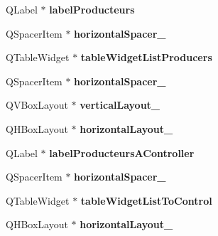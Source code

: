 \begin{DoxyCompactItemize}
\item 
\hypertarget{classUi__MainWindow2_ac139e252e74cac40ad92367d630a1291}{Q\-Label $\ast$ {\bfseries label\-Producteurs}}\label{classUi__MainWindow2_ac139e252e74cac40ad92367d630a1291}

\item 
\hypertarget{classUi__MainWindow2_a14a4b243d8845d0acc2425fb8d546f4c}{Q\-Spacer\-Item $\ast$ {\bfseries horizontal\-Spacer\-\_}}\label{classUi__MainWindow2_a14a4b243d8845d0acc2425fb8d546f4c}

\item 
\hypertarget{classUi__MainWindow2_a4dba57947c63c57efe8fd07a63258927}{Q\-Table\-Widget $\ast$ {\bfseries table\-Widget\-List\-Producers}}\label{classUi__MainWindow2_a4dba57947c63c57efe8fd07a63258927}

\item 
\hypertarget{classUi__MainWindow2_a91f77fb52ba53b76ad3d18509a104251}{Q\-Spacer\-Item $\ast$ {\bfseries horizontal\-Spacer\-\_}}\label{classUi__MainWindow2_a91f77fb52ba53b76ad3d18509a104251}

\item 
\hypertarget{classUi__MainWindow2_a8ad87390526f5ccb43afa10f6acd932f}{Q\-V\-Box\-Layout $\ast$ {\bfseries vertical\-Layout\-\_}}\label{classUi__MainWindow2_a8ad87390526f5ccb43afa10f6acd932f}

\item 
\hypertarget{classUi__MainWindow2_acb6d2458d307d805be02fa2a69c24d43}{Q\-H\-Box\-Layout $\ast$ {\bfseries horizontal\-Layout\-\_}}\label{classUi__MainWindow2_acb6d2458d307d805be02fa2a69c24d43}

\item 
\hypertarget{classUi__MainWindow2_aaceff68f2657801eabf1369594cdbd49}{Q\-Label $\ast$ {\bfseries label\-Producteurs\-A\-Controller}}\label{classUi__MainWindow2_aaceff68f2657801eabf1369594cdbd49}

\item 
\hypertarget{classUi__MainWindow2_abecd0bcf030b1589a6e9b0f598227b77}{Q\-Spacer\-Item $\ast$ {\bfseries horizontal\-Spacer\-\_}}\label{classUi__MainWindow2_abecd0bcf030b1589a6e9b0f598227b77}

\item 
\hypertarget{classUi__MainWindow2_ab98098e543e8edc897a29a924074a7b3}{Q\-Table\-Widget $\ast$ {\bfseries table\-Widget\-List\-To\-Control}}\label{classUi__MainWindow2_ab98098e543e8edc897a29a924074a7b3}

\item 
\hypertarget{classUi__MainWindow2_a7ea778cf7fb39a16c0e4927d0c3f06a5}{Q\-H\-Box\-Layout $\ast$ {\bfseries horizontal\-Layout\-\_}}\label{classUi__MainWindow2_a7ea778cf7fb39a16c0e4927d0c3f06a5}


\end{DoxyCompactItemize}
